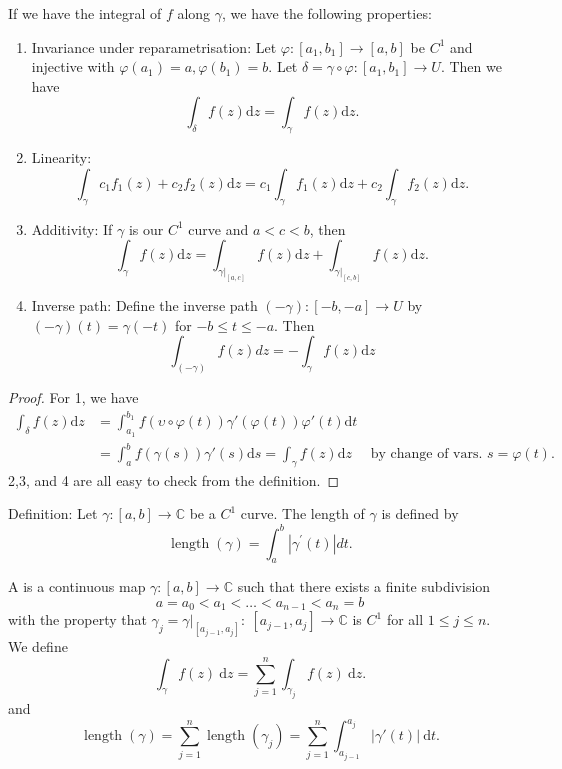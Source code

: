 \documentclass[a4paper]{scrartcl}
\begin{document}
\begin{proposition}
      If we have the integral of $f$ along $\gamma$, we have the following properties: 
      \begin{enumerate}
           \item Invariance under reparametrisation: Let $\varphi: [a_1 ,b_1 ] \rightarrow [a,b]$ be $C^1$ and injective with $\varphi (a_1 )=a, \varphi (b_1 )=b.$ Let $\delta= \gamma \circ \varphi : [a_1 ,b_1] \rightarrow U$. Then we have \[
           \int_{\delta}^{}f (z) \mathrm{d}z= \int_{\gamma}^{}f (z) \mathrm{d}z  
           .\]  
           \item Linearity: \[
           \int_{\gamma}^{}c_1 f_1 (z)+ c_2 f_2 (z) \mathrm{d}z= c_1 \int_{\gamma}^{}f_1 (z) \mathrm{d}z +c_2  \int_{\gamma}^{}f_2 (z) \mathrm{d}z 
           .\] 
           \item Additivity: If $\gamma$ is our $C^1$ curve and $a<c<b$, then \[
           \int_{\gamma}^{}f (z) \mathrm{d}z = \int_{\gamma|_[a,c]}^{}f (z) \mathrm{d}z + \int_{\gamma|_[c,b]}^{}f (z) \mathrm{d}z  
           .\] 
           \item Inverse path: Define the inverse path $(-\gamma):[-b,-a] \rightarrow U$ by $(-\gamma)(t)=\gamma(-t)$ for $-b \leq t \leq-a$. Then
           $$
           \int_{(-\gamma)} f(z) d z=-\int_{\gamma} f(z) \mathrm{d} z
           $$
      \end{enumerate}
\end{proposition}
\begin{proof}
     For 1, we have 
     \begin{align*}
          \int_{\delta}^{}f (z) \mathrm{d}z &= \int_{a_1 }^{b_1 }f (\upsilon \circ \varphi (t)) \gamma' (\varphi (t))\varphi' (t) \mathrm{d}t \\
          &=\int_{a}^{b}f (\gamma (s))\gamma' (s) \mathrm{d}s = \int_{\gamma}^{}f (z) \mathrm{d}z \quad \text{ by change of vars. } s=\varphi (t).
      \end{align*}
      2,3, and 4 are all easy to check from the definition.
\end{proof}
\begin{definition*}
     Definition: Let $\gamma:[a, b] \rightarrow \mathbb{C}$ be a $C^{1}$ curve. The length of $\gamma$ is defined by
     $$
     \operatorname{length}(\gamma)=\int_{a}^{b}\left|\gamma^{\prime}(t)\right| d t.
     $$
\end{definition*}
\begin{definition*}
      A  is a continuous map $\gamma: [a,b] \rightarrow \mathbb{C}$ such that there exists a finite subdivision \[
      a=a_0 <a_1 < \ldots <a_{n-1}<a_{n}=b
      \] with the property that $\gamma_{j}=\gamma|_{[a_{j-1},a_j]}: \ [a_{j-1},a_j] \rightarrow \mathbb{C}$ is $C^{1}$ for all $1 \leq j \leq n$. We define \[
      \int_{\gamma}^{}f (z) \ \mathrm{d} z= \sum_{j=1}^{n} \int_{\gamma_{j}}^{}f (z) \ \mathrm{d}z 
      .\] 
      and \[
          \operatorname{length}(\gamma)=\sum_{j=1}^{n}\operatorname{length}(\gamma_{j})=\sum_{j=1}^{n}\int_{a_{j-1}}^{a_j}|\gamma' (t)| \ \mathrm{d}t 
      .\] 
\end{definition*}
\end{document}
